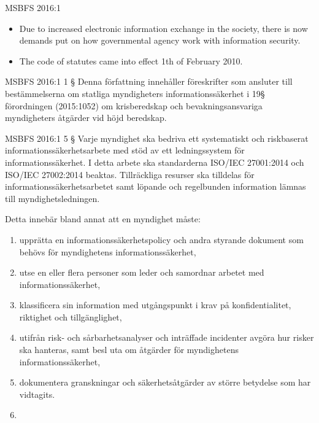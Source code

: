 \documentclass{beamer}
\begin{document}
\begin{frame}{MSBFS 2016:1}
  \begin{itemize}
    \item Due to increased electronic information exchange in the society, there
      is now demands put on how governmental agency work with information
      security.

    \item The code of statutes came into effect 1th of February 2010.

  \end{itemize}
\end{frame}

\begin{frame}{MSBFS 2016:1}
  1 §  Denna författning innehåller föreskrifter som ansluter till
  bestämmelserna om statliga myndigheters informationssäkerhet i 19§
  förordningen (2015:1052) om krisberedskap och bevakningsansvariga
  myndigheters åtgärder vid höjd beredskap. 

\end{frame}

\begin{frame}{MSBFS 2016:1}
  5 §  Varje myndighet ska bedriva ett systematiskt och riskbaserat
  informationssäkerhetsarbete med stöd av ett ledningssystem för
  informationssäkerhet. I detta arbete ska standarderna ISO/IEC 27001:2014 och
  ISO/IEC 27002:2014 beaktas. Tillräckliga resurser ska tilldelas för
  informationssäkerhetsarbetet samt löpande och regelbunden information lämnas
  till myndighetsledningen.
  
  Detta innebär bland annat att en myndighet måste: 
  \begin{enumerate}
    \item upprätta en informationssäkerhetspolicy och andra styrande dokument 
      som behövs för myndighetens informationssäkerhet,
    \item utse en eller flera personer som leder och samordnar arbetet med 
      informationssäkerhet,
    \item klassificera sin information med utgångspunkt i krav på 
      konfidentialitet, riktighet och tillgänglighet,
    \item utifrån risk- och sårbarhetsanalyser och inträffade incidenter 
      avgöra hur risker ska hanteras, samt besl uta om åtgärder för 
      myndighetens informationssäkerhet,
    \item dokumentera granskningar och säkerhetsåtgärder av större betydelse 
      som har vidtagits.
    \item 
  \end{enumerate}
\end{frame}
\end{document}
